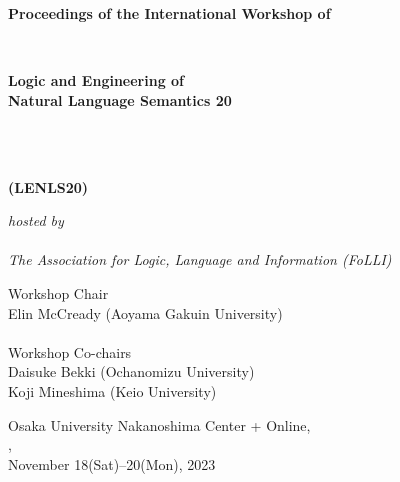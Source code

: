 \documentclass[12pt]{jarticle}
\begin{document}
\pagestyle{empty}

\vspace*{1cm}

\begin{center}

\begin{Large}
{\bf Proceedings of the International Workshop of}
\end{Large} 
\\
\begin{huge}
{\bf Logic and Engineering of \\
Natural Language Semantics 20} 
\end{huge}
\\\ \\
\begin{huge}
{\bf (LENLS20)}
\end{huge}

\vspace*{1cm}

\begin{Large}
{\em hosted by \\\ \\ The Association for Logic, Language and Information (FoLLI)}
\end{Large}

\begin{large}
\vspace*{1cm}
Workshop Chair\\ $\;$\\
Elin McCready (Aoyama Gakuin University) \\
\ \\
Workshop Co-chairs\\ $\;$\\
Daisuke Bekki (Ochanomizu University) \\
Koji Mineshima (Keio University) \\

\end{large}

\vspace*{3cm}


\vspace*{1cm}

\begin{large}
Osaka University Nakanoshima Center + Online, \\
, \\
November 18(Sat)--20(Mon), 2023
\end{large}
\vfill

\end{center}
\end{document}
